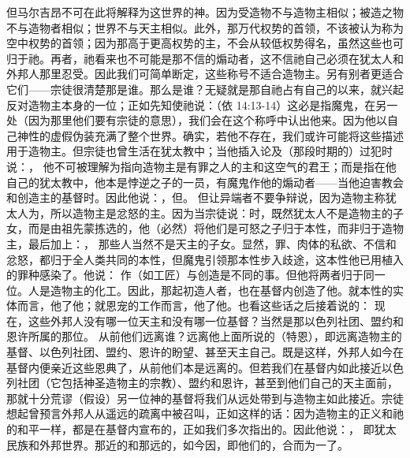 但马尔吉昂不可在此将解释为这世界的神。因为受造物不与造物主相似；被造之物不与造物者相似；世界不与天主相似。此外，那万代权势的首领，不该被认为称为空中权势的首领；因为那高于更高权势的主，不会从较低权势得名，虽然这些也可归于祂。再者，祂看来也不可能是那不信的煽动者，这不信祂自己必须在犹太人和外邦人那里忍受。因此我们可简单断定，这些称号不适合造物主。另有别者更适合它们——宗徒很清楚那是谁。那么是谁？无疑就是那自祂占有自己的以来，就兴起反对造物主本身的一位；正如先知使祂说：（依 14:13-14）这必是指魔鬼，在另一处（因为那里他们要有宗徒的意思），我们会在这个称呼中认出他来。因为他以自己神性的虚假伪装充满了整个世界。确实，若他不存在，我们或许可能将这些描述用于造物主。但宗徒也曾生活在犹太教中；当他插入论及（那段时期的）过犯时说：， 他不可被理解为指向造物主是有罪之人的主和这空气的君王；而是指在他自己的犹太教中，他本是悖逆之子的一员，有魔鬼作他的煽动者——当他迫害教会和创造主的基督时。因此他说：，但。 但让异端者不要争辩说，因为造物主称犹太人为，所以造物主是忿怒的主。因为当宗徒说：时，既然犹太人不是造物主的子女，而是由祖先蒙拣选的，他（必然）将他们是可怒之子归于本性，而非归于造物主，最后加上：， 那些人当然不是天主的子女。显然，罪、肉体的私欲、不信和忿怒，都归于全人类共同的本性，但魔鬼引领那本性步入歧途，这本性他已用植入的罪种感染了。他说： 作（如工匠）与创造是不同的事。但他将两者归于同一位。人是造物主的化工。因此，那起初造人者，也在基督内创造了他。就本性的实体而言，他了他；就恩宠的工作而言，他了他。也看这些话之后接着说的： 现在，这些外邦人没有哪一位天主和没有哪一位基督？当然是那以色列社团、盟约和恩许所属的那位。 从前他们远离谁？远离他上面所说的（特恩），即远离造物主的基督、以色列社团、盟约、恩许的盼望、甚至天主自己。既是这样，外邦人如今在基督内便亲近这些恩典了，从前他们本是远离的。但若我们在基督内如此接近以色列社团（它包括神圣造物主的宗教）、盟约和恩许，甚至到他们自己的天主面前，那就十分荒谬（假设）另一位神的基督将我们从远处带到与造物主如此接近。宗徒想起曾预言外邦人从遥远的疏离中被召叫，正如这样的话：因为造物主的正义和祂的和平一样，都是在基督内宣布的，正如我们多次指出的。因此他说：， 即犹太民族和外邦世界。那近的和那远的，如今因，即他们的，合而为一了。 
